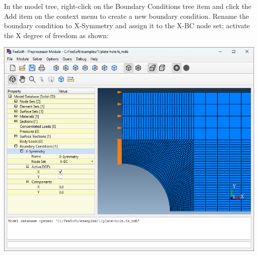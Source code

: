\documentclass[
    11pt,        %
    a4paper,     %
    final,       %
    fleqn,       %
    notitlepage, %
    onecolumn,   %
    oneside,     %
]{article}
\begin{document}
In the model tree, right-click on the Boundary Conditions tree item and click the Add item on the context menu to create a new boundary condition. Rename the boundary condition to X-Symmetry and assign it to the X-BC node set; activate the X degree of freedom as shown:
\begin{center}
\end{center}
\begin{center}
    \includegraphics[scale=0.5]{fig/ui-1-15.png}
\end{center}
\end{document}
